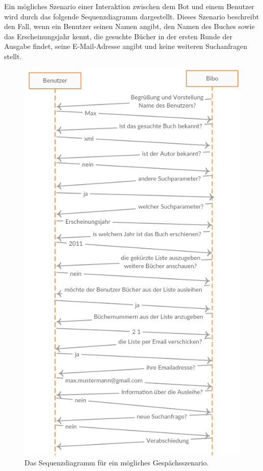 \documentclass[12pt,a4paper]{scrartcl}
\begin{document}
Ein mögliches Szenario einer Interaktion zwischen dem Bot und einem Benutzer wird durch das folgende Sequenzdiagramm dargestellt. Dieses Szenario beschreibt den Fall, wenn ein Benutzer seinen Namen angibt, den Namen des Buches sowie das Erscheinungsjahr kennt, die gesuchte Bücher in der ersten Runde der Ausgabe findet, seine E-Mail-Adresse angibt und keine weiteren Suchanfragen stellt.
\\
\begin{figure}[h!]
 \centering
  \includegraphics[height= 14 cm]{presbibo2.png}
  \caption{Das Sequenzdiagramm für ein mögliches Gespächsszenario.}
\end{figure}
\newpage
\end{document}
